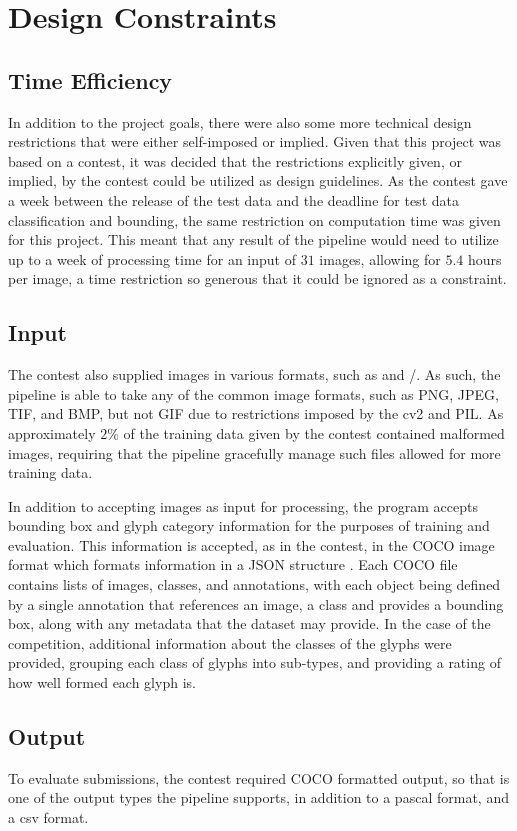 \section{Design Constraints}

\subsection{Time Efficiency}

In addition to the project goals, there were also some more technical design restrictions that were either self-imposed or implied. Given that this project was based on a contest, it was decided that the restrictions explicitly given, or implied, by the contest could be utilized as design guidelines. As the contest gave a week between the release of the test data and the deadline for test data classification and bounding, the same restriction on computation time was given for this project. This meant that any result of the pipeline would need to utilize up to a week of processing time for an input of $31$ images, allowing for $5.4$ hours per image, a time restriction so generous that it could be ignored as a constraint.

\subsection{Input}

The contest also supplied images in various formats, such as  and /. As such, the pipeline is able to take any of the common image formats, such as PNG, JPEG, TIF, and BMP, but not GIF due to restrictions imposed by the cv2 and PIL. As approximately $2\%$ of the training data given by the contest contained malformed images, requiring that the pipeline gracefully manage such files allowed for more training data.

In addition to accepting images as input for processing, the program accepts bounding box and glyph category information for the purposes of training and evaluation. This information is accepted, as in the contest, in the COCO image format which formats information in a JSON structure . Each COCO file contains lists of images, classes, and annotations, with each object being defined by a single annotation that references an image, a class and provides a bounding box, along with any metadata that the dataset may provide. In the case of the competition, additional information about the classes of the glyphs were provided, grouping each class of glyphs into sub-types, and providing a rating of how well formed each glyph is.

\subsection{Output}

To evaluate submissions, the contest required COCO formatted output, so that is one of the output types the pipeline supports, in addition to a pascal format, and a csv format.
